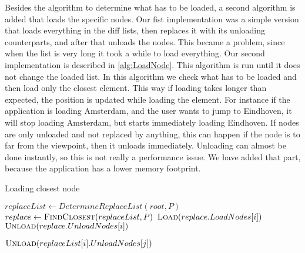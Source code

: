 Besides the algorithm to determine what has to be loaded, a second algorithm is added that loads the specific nodes. Our fist implementation was a simple version that loads everything in the diff lists, then replaces it with its unloading counterparts, and after that unloads the nodes. This became a problem, since when the list is very long it took a while to load everything. Our second implementation is described in \ref{alg:LoadNode}. This algorithm is run until it does not change the loaded list. In this algorithm we check what has to be loaded and then load only the closest element. This way if loading takes longer than expected, the position is updated while loading the element. For instance if the application is loading Amsterdam, and the user wants to jump to Eindhoven, it will stop loading Amsterdam, but starts immediately loading Eindhoven. If nodes are only unloaded and not replaced by anything, this can happen if the node is to far from the viewpoint, then it unloads immediately. Unloading can almost be done instantly, so this is not really a performance issue. We have added that part, because the application has a lower memory footprint.

\begin{algorithm}[h]
\caption{Loading closest node}\label{alg:LoadNode}
\begin{algorithmic}[1]
 
    \State $replaceList \gets DetermineReplaceList(root, P)$
        \State $replace \gets \Call{FindClosest}{replaceList, P}$
            \State $\Call{Load}{replace.LoadNodes[i]}$
        \EndFor
            \State $\Call{Unload}{replace.UnloadNodes[i]}$
        \EndFor

                    \State $\Call{Unload}{replaceList[i].UnloadNodes[j]}$
                \EndFor
            \EndIf
        \EndFor
    \EndIf
\EndProcedure
\end{algorithmic}
\end{algorithm} 